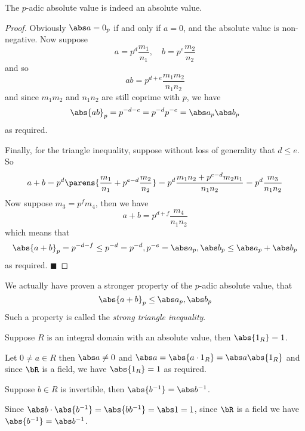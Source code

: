 \documentclass[10pt]{article}
\def\qed{%
    \ifmmode%
        \eqno\blacksquare%
    \else%
        \hskip1cm\allowbreak\hbox{}\nobreak\hfill$\blacksquare$%
    \fi%
}
\begin{document}
\begin{prop*}

    The $p$-adic absolute value is indeed an absolute value.

\end{prop*}

\begin{proof}

    Obviously $\abs a=0_p$ if and only if $a=0$, and the absolute value is non-negative.
    Now suppose
    \[ a=p^d\frac{m_1}{n_1},\quad b=p^e\frac{m_2}{n_2} \]
    and so
    \[ ab = p^{d+e}\frac{m_1m_2}{n_1n_2} \]
    and since $m_1m_2$ and $n_1n_2$ are still coprime with $p$, we have
    \[ \abs{ab}_p = p^{-d-e} = p^{-d}p^{-e} = \abs a_p\abs b_p \]
    as required.

    Finally, for the triangle inequality, suppose without loss of generality that $d\leq e$.
    So
    \[ a+b = p^d\parens{\frac{m_1}{n_1} + p^{e-d}\frac{m_2}{n_2}} = p^d\frac{m_1n_2 + p^{e-d}m_2n_1}{n_1n_2} = p^d\frac{m_3}{n_1n_2} \]
    Now suppose $m_3=p^fm_4$, then we have
    \[ a+b = p^{d+f}\frac{m_4}{n_1n_2} \]
    which means that
    \[ \abs{a+b}_p = p^{-d-f} \leq p^{-d} = \maxof{p^{-d}, p^{-e}} = \maxof{\abs a_p, \abs b_p} \leq \abs a_p + \abs b_p \]
    as required.
    \qed

\end{proof}

We actually have proven a stronger property of the $p$-adic absolute value, that
\[ \abs{a+b}_p \leq \maxof{\abs a_p, \abs b_p} \]
Such a property is called the \emph{strong triangle inequality}.

\begin{prop*}

    Suppose $R$ is an integral domain with an absolute value, then $\abs{1_R}=1$.

\end{prop*}

Let $0\neq a\in R$ then $\abs a\neq0$ and $\abs a=\abs{a\cdot1_R}=\abs a\abs{1_R}$ and since $\bR$ is a field, we have $\abs{1_R}=1$ as required.

\begin{prop*}

    Suppose $b\in R$ is invertible, then $\abs{b^{-1}}=\abs b^{-1}$.

\end{prop*}

Since $\abs b\cdot\abs{b^{-1}} = \abs{bb^{-1}}=\abs1=1$, since $\bR$ is a field we have $\abs{b^{-1}}=\abs b^{-1}$.
\end{document}
